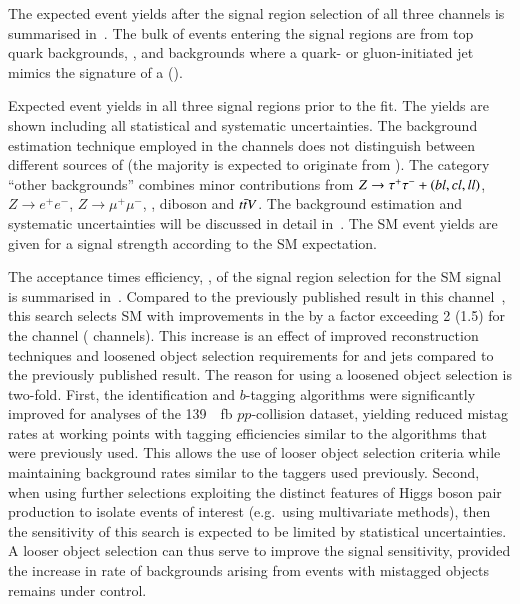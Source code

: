 The expected event yields after the signal region selection of all
three channels is summarised in~. The
bulk of events entering the signal regions are from top quark
backgrounds, \Zjets, and backgrounds where a quark- or gluon-initiated
jet mimics the signature of a \tauhadvis (\jettotauhadvis).

\begin{table}[htbp]
  \centering

  \caption{Expected event yields in all three signal regions prior to
    the fit. The yields are shown including all statistical and
    systematic uncertainties. The \faketauhadvis background estimation
    technique employed in the \lephad channels does not distinguish
    between different sources of \faketauhadvis (the majority is
    expected to originate from \ttbar).  The category ``other
    backgrounds'' combines minor contributions from
    $Z \to \tau^{+} \tau^{-} + (bl,cl,ll)$, $Z \to e^{+}e^{-}$,
    $Z \to \mu^{+}\mu^{-}$, \Wjets, diboson and $t\bar{t} V$. The
    background estimation and systematic uncertainties will be
    discussed in detail
    in~. The SM \HH
    event yields are given for a signal strength according to the SM
    expectation.}%
  \label{tab:smhh_prefit_yields}%
  \label{tab:hadhad_presel_yields}

  \resizebox{\textwidth}{!}{
    
  }
\end{table}


The acceptance times efficiency, \AccTimesEff, of the signal region
selection for the SM \HH signal is summarised
in~. Compared to the previously
published result in this channel~\cite{HIGG-2016-16-witherratum}, this
search selects SM \HH with improvements in the \AccTimesEff by a
factor exceeding 2 (1.5) for the \hadhad channel (\lephad
channels). This increase is an effect of improved \tauhadvis
reconstruction techniques and loosened object selection requirements
for \tauhadvis and \btagged jets compared to the previously published
result. The reason for using a loosened object selection is
two-fold. First, the \tauhadvis identification and $b$-tagging
algorithms were significantly improved for analyses of the
\SI{139}{\per\femto\barn} $pp$-collision dataset, yielding reduced
mistag rates at working points with tagging efficiencies similar to
the algorithms that were previously used. This allows the use of
looser object selection criteria while maintaining background rates
similar to the taggers used previously. Second, when using further
selections exploiting the distinct features of Higgs boson pair
production to isolate events of interest (e.g.\ using multivariate
methods), then the sensitivity of this search is expected to be
limited by statistical uncertainties. A looser object selection can
thus serve to improve the signal sensitivity, provided the increase in
rate of backgrounds arising from events with mistagged objects remains
under control.

